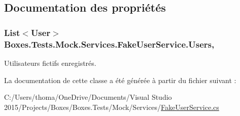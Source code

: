 \subsection{Documentation des propriétés}
\subsubsection[{\texorpdfstring{Users}{Users}}]{\setlength{\rightskip}{0pt plus 5cm}List$<$User$>$ Boxes.\+Tests.\+Mock.\+Services.\+Fake\+User\+Service.\+Users\hspace{0.3cm}{\ttfamily [get]}, {}}\hypertarget{class_boxes_1_1_tests_1_1_mock_1_1_services_1_1_fake_user_service_a01b006f8e38195c46cbc92662c80572b}{}\label{class_boxes_1_1_tests_1_1_mock_1_1_services_1_1_fake_user_service_a01b006f8e38195c46cbc92662c80572b}


Utilisateurs fictifs enregistrés. 



La documentation de cette classe a été générée à partir du fichier suivant \+:\begin{DoxyCompactItemize}
\item 
C\+:/\+Users/thoma/\+One\+Drive/\+Documents/\+Visual Studio 2015/\+Projects/\+Boxes/\+Boxes.\+Tests/\+Mock/\+Services/\hyperlink{_fake_user_service_8cs}{Fake\+User\+Service.\+cs}\end{DoxyCompactItemize}
